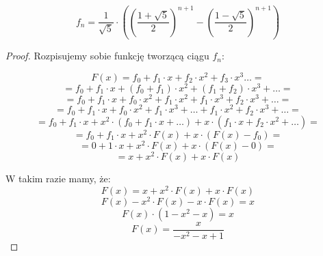 \begin{theorem}
	\begin{equation}
		f_n = \frac{1}{\sqrt{5}} \cdot \left( \left(\frac{1 + \sqrt{5}}{2}\right)^{n+1} - \left(\frac{1 - \sqrt{5}}{2}\right)^{n+1} \right)
	\end{equation}
\end{theorem}

\begin{proof}
	Rozpisujemy sobie funkcję tworzącą ciągu $f_n$:

	\begin{equation*}
		F(x) = f_0 + f_1 \cdot x + f_2 \cdot x^2 + f_3 \cdot x^3 \dots =
	\end{equation*}
	\begin{equation*}
		= f_0 + f_1 \cdot x + (f_0 + f_1) \cdot x^2 + (f_1 + f_2) \cdot x^3 + \dots =
	\end{equation*}
	\begin{equation*}
		= f_0 + f_1 \cdot x + f_0 \cdot x^2 + f_1 \cdot x^2 + f_1 \cdot x^3 + f_2 \cdot x^3 + \dots =
	\end{equation*}
	\begin{equation*}
		= f_0 + f_1 \cdot x + f_0 \cdot x^2 + f_1 \cdot x^3 + \dots + f_1 \cdot x^2 +  f_2 \cdot x^3 + \dots =
	\end{equation*}
	\begin{equation*}
		= f_0 + f_1 \cdot x + x^2 \cdot (f_0 + f_1 \cdot x + \dots) + x \cdot (f_1 \cdot x +  f_2 \cdot x^2 + \dots) =
	\end{equation*}
	\begin{equation*}
		= f_0 + f_1 \cdot x + x^2 \cdot F(x) + x \cdot (F(x) - f_0) =
	\end{equation*}
	\begin{equation*}
		= 0 + 1 \cdot x + x^2 \cdot F(x) + x \cdot (F(x) - 0) =
	\end{equation*}
	\begin{equation*}
		= x + x^2 \cdot F(x) + x \cdot F(x)
	\end{equation*}

	W takim razie mamy, że:
	\begin{equation*}
		F(x) = x + x^2 \cdot F(x) + x \cdot F(x)
	\end{equation*}
	\begin{equation*}
		F(x) -  x^2 \cdot F(x) - x \cdot F(x)  = x
	\end{equation*}
	\begin{equation*}
		F(x) \cdot (1 - x^2 - x) = x
	\end{equation*}
	\begin{equation*}
		F(x) = \frac{x}{-x^2 -x + 1}
	\end{equation*}


\end{proof}
